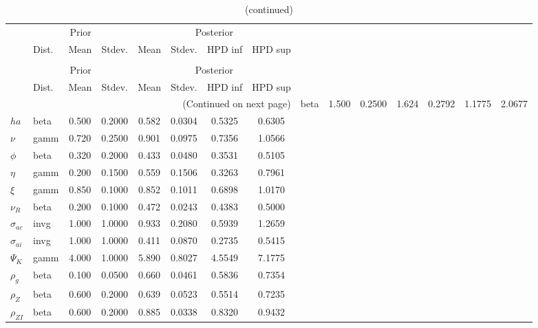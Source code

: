  
\begin{center}
\begin{longtable}{llcccccc} 
\caption{Results from Metropolis-Hastings (parameters)}
 \label{Table:MHPosterior:1}\\
\toprule 
  & \multicolumn{3}{c}{Prior}  &  \multicolumn{4}{c}{Posterior} \\
  \cmidrule(r{.75em}){2-4} \cmidrule(r{.75em}){5-8}
  & Dist. & Mean  & Stdev. & Mean & Stdev. & HPD inf & HPD sup\\
\midrule \endfirsthead 
\caption{(continued)}\\\toprule 
  & \multicolumn{3}{c}{Prior}  &  \multicolumn{4}{c}{Posterior} \\
  \cmidrule(r{.75em}){2-4} \cmidrule(r{.75em}){5-8}
  & Dist. & Mean  & Stdev. & Mean & Stdev. & HPD inf & HPD sup\\
\midrule \endhead 
\bottomrule \multicolumn{8}{r}{(Continued on next page)} \endfoot 
\bottomrule \endlastfoot 
${\sigma}$ & beta &   1.500 & 0.2500 &   1.624& 0.2792 &  1.1775 &  2.0677 \\ 
${ha}$ & beta &   0.500 & 0.2000 &   0.582& 0.0304 &  0.5325 &  0.6305 \\ 
$\nu$ & gamm &   0.720 & 0.2500 &   0.901& 0.0975 &  0.7356 &  1.0566 \\ 
${\phi}$ & beta &   0.320 & 0.2000 &   0.433& 0.0480 &  0.3531 &  0.5105 \\ 
${\eta}$ & gamm &   0.200 & 0.1500 &   0.559& 0.1506 &  0.3263 &  0.7961 \\ 
$\xi$ & gamm &   0.850 & 0.1000 &   0.852& 0.1011 &  0.6898 &  1.0170 \\ 
${\nu_R}$ & beta &   0.200 & 0.1000 &   0.472& 0.0243 &  0.4383 &  0.5000 \\ 
${\sigma_{ac}}$ & invg &   1.000 & 1.0000 &   0.933& 0.2080 &  0.5939 &  1.2659 \\ 
${\sigma_{ai}}$ & invg &   1.000 & 1.0000 &   0.411& 0.0870 &  0.2735 &  0.5415 \\ 
${\Psi_{K}}$ & gamm &   4.000 & 1.0000 &   5.890& 0.8027 &  4.5549 &  7.1775 \\ 
${\rho_g}$ & beta &   0.100 & 0.0500 &   0.660& 0.0461 &  0.5836 &  0.7354 \\ 
${\rho_Z}$ & beta &   0.600 & 0.2000 &   0.639& 0.0523 &  0.5514 &  0.7235 \\ 
${\rho_{ZI}}$ & beta &   0.600 & 0.2000 &   0.885& 0.0338 &  0.8320 &  0.9432 \\ 

\end{longtable}
\end{center}
